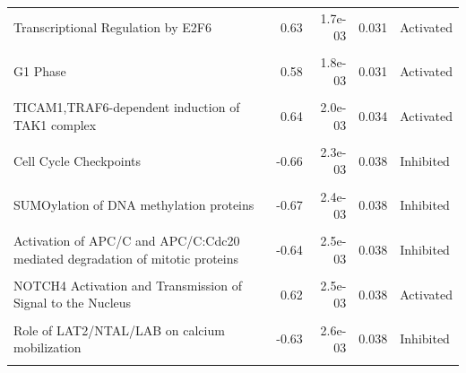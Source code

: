\documentclass[9pt,a4paper,]{extarticle}
\begin{document}
\begin{table}
{\begin{tabular}[t]{lrrrl}
Transcriptional Regulation by E2F6 & 0.63 & 1.7e-03 & 0.031 & Activated\\
\addlinespace
\cellcolor{gray!6}{Cyclin D associated events in G1} & \cellcolor{gray!6}{0.58} & \cellcolor{gray!6}{1.8e-03} & \cellcolor{gray!6}{0.031} & \cellcolor{gray!6}{Activated}\\
G1 Phase & 0.58 & 1.8e-03 & 0.031 & Activated\\
\cellcolor{gray!6}{S Phase} & \cellcolor{gray!6}{-0.67} & \cellcolor{gray!6}{1.8e-03} & \cellcolor{gray!6}{0.031} & \cellcolor{gray!6}{Inhibited}\\
TICAM1,TRAF6-dependent induction of TAK1 complex & 0.64 & 2.0e-03 & 0.034 & Activated\\
\cellcolor{gray!6}{Processing of Capped Intron-Containing Pre-mRNA} & \cellcolor{gray!6}{-0.62} & \cellcolor{gray!6}{2.1e-03} & \cellcolor{gray!6}{0.034} & \cellcolor{gray!6}{Inhibited}\\
\addlinespace
Cell Cycle Checkpoints & -0.66 & 2.3e-03 & 0.038 & Inhibited\\
\cellcolor{gray!6}{Senescence-Associated Secretory Phenotype (SASP)} & \cellcolor{gray!6}{0.67} & \cellcolor{gray!6}{2.3e-03} & \cellcolor{gray!6}{0.038} & \cellcolor{gray!6}{Activated}\\
SUMOylation of DNA methylation proteins & -0.67 & 2.4e-03 & 0.038 & Inhibited\\
\cellcolor{gray!6}{APC/C:Cdc20 mediated degradation of mitotic proteins} & \cellcolor{gray!6}{-0.64} & \cellcolor{gray!6}{2.4e-03} & \cellcolor{gray!6}{0.038} & \cellcolor{gray!6}{Inhibited}\\
Activation of APC/C and APC/C:Cdc20 mediated degradation of mitotic proteins & -0.64 & 2.5e-03 & 0.038 & Inhibited\\
\addlinespace
\cellcolor{gray!6}{Translesion synthesis by Y family DNA polymerases bypasses lesions on DNA template} & \cellcolor{gray!6}{-0.62} & \cellcolor{gray!6}{2.5e-03} & \cellcolor{gray!6}{0.038} & \cellcolor{gray!6}{Inhibited}\\
NOTCH4 Activation and Transmission of Signal to the Nucleus & 0.62 & 2.5e-03 & 0.038 & Activated\\
\cellcolor{gray!6}{Translation} & \cellcolor{gray!6}{-0.65} & \cellcolor{gray!6}{2.6e-03} & \cellcolor{gray!6}{0.038} & \cellcolor{gray!6}{Inhibited}\\
Role of LAT2/NTAL/LAB on calcium mobilization & -0.63 & 2.6e-03 & 0.038 & Inhibited\\
\cellcolor{gray!6}{pre-mRNA splicing} & \cellcolor{gray!6}{-0.60} & \cellcolor{gray!6}{2.7e-03} & \cellcolor{gray!6}{0.038} & \cellcolor{gray!6}{Inhibited}\\

\end{tabular}}
\end{table}
\end{document}

